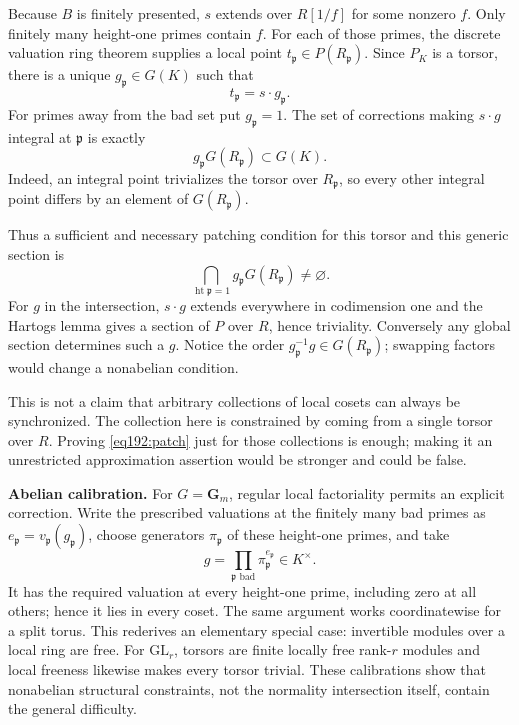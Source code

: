 \documentclass[11pt,a4paper]{article}
\numberwithin{equation}{section}
\begin{document}
Because $B$ is finitely presented, $s$ extends over $R[1/f]$ for some nonzero $f$. Only finitely many height-one primes contain $f$. For each of those primes, the discrete valuation ring theorem supplies a local point $t_{\mathfrak p}\in P(R_{\mathfrak p})$. Since $P_K$ is a torsor, there is a unique $g_{\mathfrak p}\in G(K)$ such that
\[
 t_{\mathfrak p}=s\cdot g_{\mathfrak p}.
\]
For primes away from the bad set put $g_{\mathfrak p}=1$. The set of corrections making $s\cdot g$ integral at $\mathfrak p$ is exactly
\[
 g_{\mathfrak p}G(R_{\mathfrak p})\subset G(K).
\]
Indeed, an integral point trivializes the torsor over $R_{\mathfrak p}$, so every other integral point differs by an element of $G(R_{\mathfrak p})$.

Thus a sufficient and necessary patching condition for this torsor and this generic section is
\begin{equation}\label{eq192:patch}
 \bigcap_{\operatorname{ht}\mathfrak p=1}
          g_{\mathfrak p}G(R_{\mathfrak p})\ne\varnothing.
\end{equation}
For $g$ in the intersection, $s\cdot g$ extends everywhere in codimension one and the Hartogs lemma gives a section of $P$ over $R$, hence triviality. Conversely any global section determines such a $g$. Notice the order $g_{\mathfrak p}^{-1}g\in G(R_{\mathfrak p})$; swapping factors would change a nonabelian condition.

This is not a claim that arbitrary collections of local cosets can always be synchronized. The collection here is constrained by coming from a single torsor over $R$. Proving \eqref{eq192:patch} just for those collections is enough; making it an unrestricted approximation assertion would be stronger and could be false.

\textbf{Abelian calibration.} For $G=\mathbf G_m$, regular local factoriality permits an explicit correction. Write the prescribed valuations at the finitely many bad primes as $e_{\mathfrak p}=v_{\mathfrak p}(g_{\mathfrak p})$, choose generators $\pi_{\mathfrak p}$ of these height-one primes, and take
\[
 g=\prod_{\mathfrak p\text{ bad}}\pi_{\mathfrak p}^{e_{\mathfrak p}}\in K^\times.
\]
It has the required valuation at every height-one prime, including zero at all others; hence it lies in every coset. The same argument works coordinatewise for a split torus. This rederives an elementary special case: invertible modules over a local ring are free. For $\mathrm{GL}_r$, torsors are finite locally free rank-$r$ modules and local freeness likewise makes every torsor trivial. These calibrations show that nonabelian structural constraints, not the normality intersection itself, contain the general difficulty.
\end{document}
